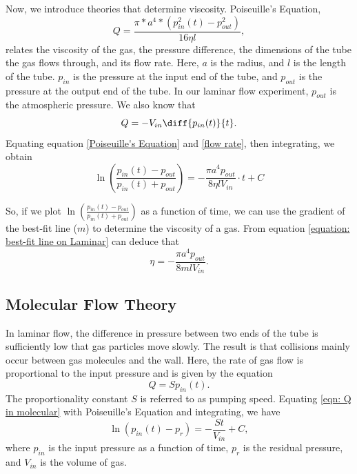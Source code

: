 \documentclass[12pt,a4paper]{article}
\begin{document}
		Now, we introduce theories that determine viscosity.
		Poiseuille's Equation,\\
			\begin{equation}
				Q=\frac{\pi*a^4*(p_{in}^2(t)-p_{out}^2)}{16 \eta l},
				\label{Poiseuille's Equation}
			\end{equation}
		relates the viscosity of the gas, the pressure difference, the dimensions of the tube the gas flows through, and its flow rate. Here, $a$ is the radius, and $l$ is the length of the tube. $p_{in}$ is the pressure at the input end of the tube, and $p_{out}$ is the pressure at the output end of the tube. In our laminar flow experiment, $p_{out}$ is the atmospheric pressure. We also know that\\
		\begin{equation}
			Q=-V_{in} \diff{p_{in}(t)}{t}.
			\label{flow rate}
		\end{equation}
	Equating equation \ref{Poiseuille's Equation} and \ref{flow rate}, then integrating, we obtain\\
		\begin{equation}
			\ln (\frac{p_{in}(t)-p_{out}}{p_{in}(t)+p_{out}})=-\frac{\pi a^4 p_{out}}{8 \eta l V_{in}} \cdot t+C
			\label{equation: best-fit line on Laminar}
		\end{equation}	
	
	So, if we plot $\ln (\frac{p_{in}(t)-p_{out}}{p_{in}(t)+p_{out}})$ as a function of time, we can use the gradient of the best-fit line ($m$) to determine the viscosity of a gas. From equation \ref{equation: best-fit line on Laminar} can deduce that\\
	\begin{equation}
		\eta=-\frac{\pi a^4 p_{out}}{8 m l V_{in}}. 
		\label{eq: viscosity}
	\end{equation}
	\subsection{Molecular Flow Theory}
	In laminar flow, the difference in pressure between two ends of the tube is sufficiently low that gas particles move slowly. The result is that collisions mainly occur between gas molecules and the wall. Here, the rate of gas flow is proportional to the input pressure and is given by the equation\\
	\begin{equation}
		Q=S p_{in}(t). \label{eqn: Q in molecular}
	\end{equation} 
	The proportionality constant $S$ is referred to as pumping speed.
	Equating \ref{eqn: Q in molecular} with Poiseuille's Equation and integrating, we have\\
	\begin{equation}
		\ln (p_{in}(t)-p_r)=-\frac{St}{V_{in}}+C,\label{eqn: Molecular best fit}
	\end{equation}
	where $p_{in}$ is the input pressure as a function of time, $p_r$ is the residual pressure, and $V_{in}$ is the volume of gas.\cite{Lab_Instruction}
\end{document}
